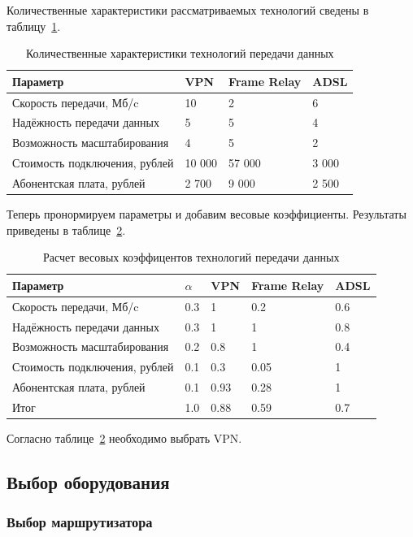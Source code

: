 \documentclass[russian,utf8,emptystyle]{eskdtext}
\begin{document}
Количественные характеристики рассматриваемых технологий сведены в таблицу~\ref{tab:connect-2}.

\begin{longtable}{p{7cm}|p{2cm}|p{2cm}|p{2cm}}
\caption{Количественные характеристики технологий передачи данных}
\label{tab:connect-2} \\
Параметр  & VPN & Frame Relay & ADSL \\ 
\hline 
Скорость передачи, Мб/c     & 10 & 2 & 6  \\ 
Надёжность передачи данных & 5 & 5 & 4  \\ 
Возможность масштабирования & 4 & 5 & 2  \\ 
Стоимость подключения, рублей & 10 000 & 57 000 & 3 000  \\ 
Абонентская плата, рублей & 2 700 & 9 000 & 2 500 \\
\end{longtable}

Теперь пронормируем параметры и добавим весовые коэффициенты. Результаты приведены в таблице~\ref{tab:connect-3}.

\begin{longtable}{p{7cm}|p{1cm}|p{2cm}|p{2cm}|p{2cm}}
\caption{Расчет весовых коэффицентов технологий передачи данных}
\label{tab:connect-3} \\
Параметр & $\alpha$ & VPN & Frame Relay & ADSL \\ 
\hline 
Скорость передачи, Мб/c      & 0.3 & 1    & 0.2  & 0.6   \\ 
Надёжность передачи данных   & 0.3 & 1    & 1    & 0.8   \\ 
Возможность масштабирования  & 0.2 & 0.8  & 1    & 0.4   \\ 
Стоимость подключения, рублей& 0.1 & 0.3  & 0.05 & 1     \\ 
Абонентская плата, рублей    & 0.1 & 0.93 & 0.28 & 1     \\
\hline
Итог                         & 1.0 & 0.88 & 0.59 & 0.7
\end{longtable}

Согласно таблице~\ref{tab:connect-3} необходимо выбрать VPN. 

\clearpage
\subsection{Выбор оборудования}
\subsubsection{Выбор маршрутизатора}
\end{document}
